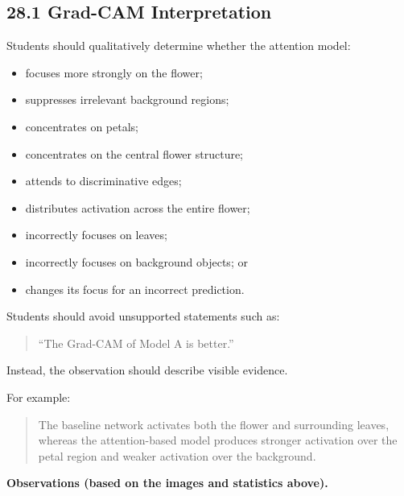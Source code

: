 \documentclass[10pt]{article}
\begin{document}
\subsection*{28.1 Grad-CAM Interpretation}

Students should qualitatively determine whether the attention model:

\begin{itemize}

\item focuses more strongly on the flower;

\item suppresses irrelevant background regions;

\item concentrates on petals;

\item concentrates on the central flower structure;

\item attends to discriminative edges;

\item distributes activation across the entire flower;

\item incorrectly focuses on leaves;

\item incorrectly focuses on background objects; or

\item changes its focus for an incorrect prediction.

\end{itemize}

Students should avoid unsupported statements such as:

\begin{quote}
``The Grad-CAM of Model A is better.''
\end{quote}

Instead, the observation should describe visible evidence.

For example:

\begin{quote}
The baseline network activates both the flower and surrounding leaves,
whereas the attention-based model produces stronger activation over the petal
region and weaker activation over the background.
\end{quote}


\textbf{Observations (based on the images and statistics above).}
\end{document}
